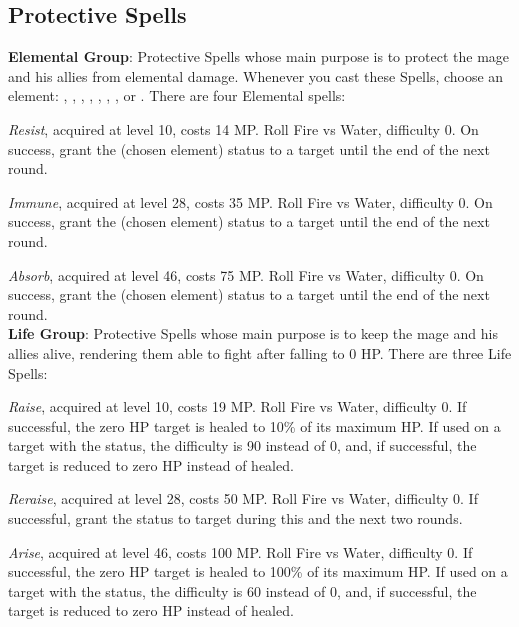 \begin{multicols}{2}
    \subsection{Protective Spells}\label{subsec:white-protective}

    \textbf{Elemental Group}: Protective Spells whose main purpose is to protect the mage and his allies from elemental damage. Whenever you cast these Spells, choose an element: , , , , , , ,  or . There are four Elemental spells:

    \textit{Resist}, acquired at level 10, costs 14 MP\@. Roll Fire vs Water, difficulty 0. On success, grant the  (chosen element) status to a target until the end of the next round.

    \textit{Immune}, acquired at level 28, costs 35 MP\@. Roll Fire vs Water, difficulty 0. On success, grant the  (chosen element) status to a target until the end of the next round.

    \textit{Absorb}, acquired at level 46, costs 75 MP\@. Roll Fire vs Water, difficulty 0. On success, grant the  (chosen element) status to a target until the end of the next round.\\%

    \textbf{Life Group}: Protective Spells whose main purpose is to keep the mage and his allies alive, rendering them able to fight after falling to 0 HP\@. There are three Life Spells:

    \textit{Raise}, acquired at level 10, costs 19 MP\@. Roll Fire vs Water, difficulty 0. If successful, the zero HP target is healed to 10\% of its maximum HP\@. If used on a target with the  status, the difficulty is 90 instead of 0, and, if successful, the target is reduced to zero HP instead of healed.

    \textit{Reraise}, acquired at level 28, costs 50 MP\@. Roll Fire vs Water, difficulty 0. If successful, grant the  status to target during this and the next two rounds.

    \textit{Arise}, acquired at level 46, costs 100 MP\@. Roll Fire vs Water, difficulty 0. If successful, the zero HP target is healed to 100\% of its maximum HP\@. If used on a target with the  status, the difficulty is 60 instead of 0, and, if successful, the target is reduced to zero HP instead of healed.\\%


\end{multicols}
